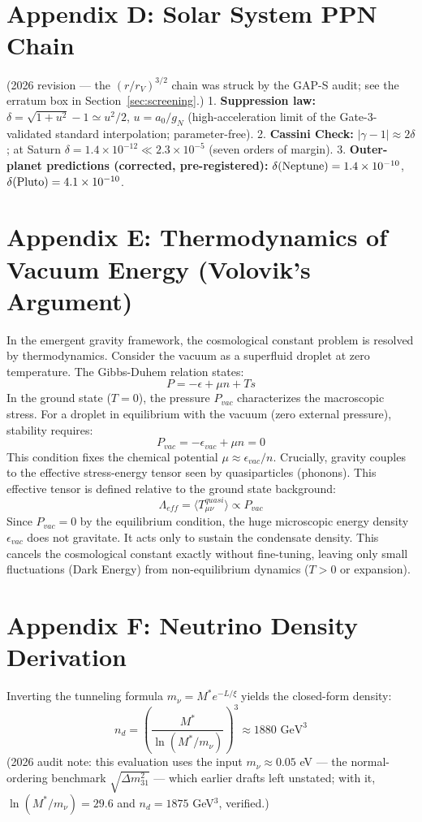 \documentclass[a4paper,12pt]{article}
\begin{document}
\section{Appendix D: Solar System PPN Chain}
(2026 revision --- the $(r/r_V)^{3/2}$ chain was struck by the GAP-S audit; see the
erratum box in Section~\ref{sec:screening}.)
1. \textbf{Suppression law:} $\delta = \sqrt{1+u^2}-1 \simeq u^2/2$, $u = a_0/g_N$
   (high-acceleration limit of the Gate-3-validated standard interpolation;
   parameter-free).
2. \textbf{Cassini Check:} $|\gamma-1| \approx 2\delta$; at Saturn
   $\delta = 1.4\times10^{-12} \ll 2.3\times10^{-5}$ (seven orders of margin).
3. \textbf{Outer-planet predictions (corrected, pre-registered):}
   $\delta({\rm Neptune}) = 1.4\times10^{-10}$, $\delta({\rm Pluto}) = 4.1\times10^{-10}$.

\section{Appendix E: Thermodynamics of Vacuum Energy (Volovik's Argument)}
In the emergent gravity framework, the cosmological constant problem is resolved by thermodynamics.
Consider the vacuum as a superfluid droplet at zero temperature. The Gibbs-Duhem relation states:
\begin{equation}
    P = -\epsilon + \mu n + Ts
\end{equation}
In the ground state ($T=0$), the pressure $P_{vac}$ characterizes the macroscopic stress.
For a droplet in equilibrium with the vacuum (zero external pressure), stability requires:
\begin{equation}
    P_{vac} = -\epsilon_{vac} + \mu n = 0
\end{equation}
This condition fixes the chemical potential $\mu \approx \epsilon_{vac}/n$.
Crucially, gravity couples to the effective stress-energy tensor seen by quasiparticles (phonons). This effective tensor is defined relative to the ground state background:
\begin{equation}
    \Lambda_{eff} = \langle T_{\mu\nu}^{quasi} \rangle \propto P_{vac}
\end{equation}
Since $P_{vac} = 0$ by the equilibrium condition, the huge microscopic energy density $\epsilon_{vac}$ does not gravitate. It acts only to sustain the condensate density. This cancels the cosmological constant exactly without fine-tuning, leaving only small fluctuations (Dark Energy) from non-equilibrium dynamics ($T > 0$ or expansion).

\section{Appendix F: Neutrino Density Derivation}
Inverting the tunneling formula $m_\nu = M^* e^{-L/\xi}$ yields the closed-form density:
\begin{equation}
    n_d = \left( \frac{M^*}{\ln(M^*/m_\nu)} \right)^3 \approx 1880 \text{ GeV}^3
\end{equation}
(2026 audit note: this evaluation uses the input $m_\nu \approx 0.05$ eV --- the
normal-ordering benchmark $\sqrt{\Delta m^2_{31}}$ --- which earlier drafts left
unstated; with it, $\ln(M^*/m_\nu) = 29.6$ and $n_d = 1875$ GeV$^3$, verified.)
\end{document}

